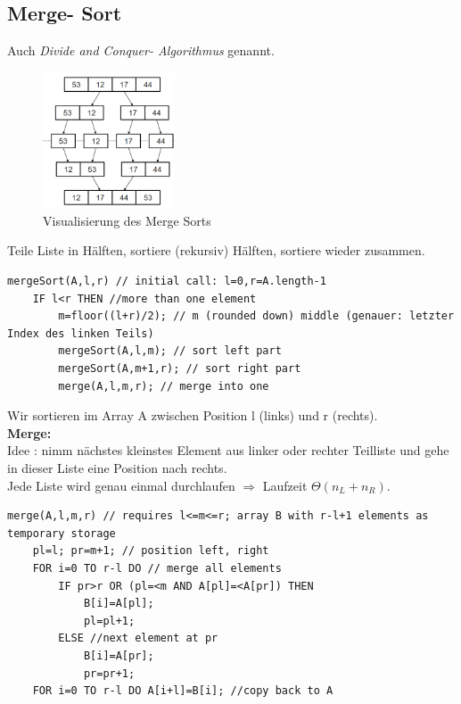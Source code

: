 \documentclass{article}
\begin{document}
        \subsection{Merge- Sort}
            Auch \textit{Divide and Conquer- Algorithmus} genannt.\\
            \begin{figure}[ht]
                \centering
                \includegraphics[width=0.35\textwidth]{Bilder/MergeSort.png}
                \caption{Visualisierung des Merge Sorts}
                \label{fig:mergesort}
            \end{figure}
            \newpage
            Teile Liste in Hälften, sortiere (rekursiv) Hälften, sortiere wieder zusammen.\\
            \begin{lstlisting}[style=pseudocode]
mergeSort(A,l,r) // initial call: l=0,r=A.length-1
    IF l<r THEN //more than one element
        m=floor((l+r)/2); // m (rounded down) middle (genauer: letzter Index des linken Teils)
        mergeSort(A,l,m); // sort left part
        mergeSort(A,m+1,r); // sort right part
        merge(A,l,m,r); // merge into one
            \end{lstlisting}
            Wir sortieren im Array A zwischen Position l (links) und r (rechts).\\
            \textbf{Merge:}\\
            Idee : nimm nächstes kleinstes Element aus linker oder rechter Teilliste und gehe in dieser Liste eine Position nach rechts.\\
            Jede Liste wird genau einmal durchlaufen $\Rightarrow$ Laufzeit $\Theta(n_L+n_R)$.\\
            \begin{lstlisting}[style=pseudocode]
merge(A,l,m,r) // requires l<=m<=r; array B with r-l+1 elements as temporary storage
    pl=l; pr=m+1; // position left, right
    FOR i=0 TO r-l DO // merge all elements
        IF pr>r OR (pl=<m AND A[pl]=<A[pr]) THEN
            B[i]=A[pl];
            pl=pl+1;
        ELSE //next element at pr
            B[i]=A[pr];
            pr=pr+1;
    FOR i=0 TO r-l DO A[i+l]=B[i]; //copy back to A
            \end{lstlisting}
\end{document}
